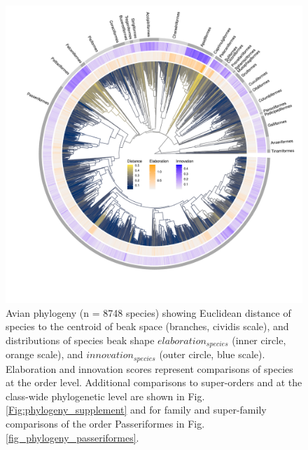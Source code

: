 \documentclass[12pt,letterpaper]{article}
\begin{document}
\begin{figure}[!htbp]
\centering
   \includegraphics[width=1\textwidth]{Figures/InnovElabTree_main_text_revision.pdf}
\caption{Avian phylogeny (n = 8748 species) showing Euclidean distance of species to the centroid of beak space (branches, cividis scale), and distributions of species beak shape $elaboration_{species}$ (inner circle, orange scale), and $innovation_{species}$ (outer circle, blue scale).
Elaboration and innovation scores represent comparisons of species at the order level.
Additional comparisons to super-orders and at the class-wide phylogenetic level are shown in Fig. \ref{Fig:phylogeny_supplement} and for family and super-family comparisons of the order Passeriformes in Fig. \ref{fig_phylogeny_passeriformes}.
}
\label{Fig:phylogeny}
\end{figure}
\bigskip

\end{document}
